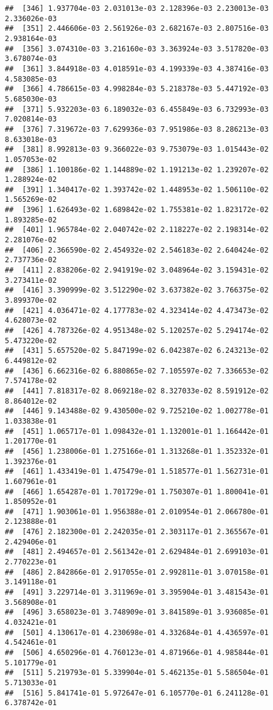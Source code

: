 \documentclass[
]{article}
\begin{document}
\begin{verbatim}
##  [346] 1.937704e-03 2.031013e-03 2.128396e-03 2.230013e-03 2.336026e-03
##  [351] 2.446606e-03 2.561926e-03 2.682167e-03 2.807516e-03 2.938164e-03
##  [356] 3.074310e-03 3.216160e-03 3.363924e-03 3.517820e-03 3.678074e-03
##  [361] 3.844918e-03 4.018591e-03 4.199339e-03 4.387416e-03 4.583085e-03
##  [366] 4.786615e-03 4.998284e-03 5.218378e-03 5.447192e-03 5.685030e-03
##  [371] 5.932203e-03 6.189032e-03 6.455849e-03 6.732993e-03 7.020814e-03
##  [376] 7.319672e-03 7.629936e-03 7.951986e-03 8.286213e-03 8.633018e-03
##  [381] 8.992813e-03 9.366022e-03 9.753079e-03 1.015443e-02 1.057053e-02
##  [386] 1.100186e-02 1.144889e-02 1.191213e-02 1.239207e-02 1.288924e-02
##  [391] 1.340417e-02 1.393742e-02 1.448953e-02 1.506110e-02 1.565269e-02
##  [396] 1.626493e-02 1.689842e-02 1.755381e-02 1.823172e-02 1.893285e-02
##  [401] 1.965784e-02 2.040742e-02 2.118227e-02 2.198314e-02 2.281076e-02
##  [406] 2.366590e-02 2.454932e-02 2.546183e-02 2.640424e-02 2.737736e-02
##  [411] 2.838206e-02 2.941919e-02 3.048964e-02 3.159431e-02 3.273411e-02
##  [416] 3.390999e-02 3.512290e-02 3.637382e-02 3.766375e-02 3.899370e-02
##  [421] 4.036471e-02 4.177783e-02 4.323414e-02 4.473473e-02 4.628073e-02
##  [426] 4.787326e-02 4.951348e-02 5.120257e-02 5.294174e-02 5.473220e-02
##  [431] 5.657520e-02 5.847199e-02 6.042387e-02 6.243213e-02 6.449812e-02
##  [436] 6.662316e-02 6.880865e-02 7.105597e-02 7.336653e-02 7.574178e-02
##  [441] 7.818317e-02 8.069218e-02 8.327033e-02 8.591912e-02 8.864012e-02
##  [446] 9.143488e-02 9.430500e-02 9.725210e-02 1.002778e-01 1.033838e-01
##  [451] 1.065717e-01 1.098432e-01 1.132001e-01 1.166442e-01 1.201770e-01
##  [456] 1.238006e-01 1.275166e-01 1.313268e-01 1.352332e-01 1.392376e-01
##  [461] 1.433419e-01 1.475479e-01 1.518577e-01 1.562731e-01 1.607961e-01
##  [466] 1.654287e-01 1.701729e-01 1.750307e-01 1.800041e-01 1.850952e-01
##  [471] 1.903061e-01 1.956388e-01 2.010954e-01 2.066780e-01 2.123888e-01
##  [476] 2.182300e-01 2.242035e-01 2.303117e-01 2.365567e-01 2.429406e-01
##  [481] 2.494657e-01 2.561342e-01 2.629484e-01 2.699103e-01 2.770223e-01
##  [486] 2.842866e-01 2.917055e-01 2.992811e-01 3.070158e-01 3.149118e-01
##  [491] 3.229714e-01 3.311969e-01 3.395904e-01 3.481543e-01 3.568908e-01
##  [496] 3.658023e-01 3.748909e-01 3.841589e-01 3.936085e-01 4.032421e-01
##  [501] 4.130617e-01 4.230698e-01 4.332684e-01 4.436597e-01 4.542461e-01
##  [506] 4.650296e-01 4.760123e-01 4.871966e-01 4.985844e-01 5.101779e-01
##  [511] 5.219793e-01 5.339904e-01 5.462135e-01 5.586504e-01 5.713033e-01
##  [516] 5.841741e-01 5.972647e-01 6.105770e-01 6.241128e-01 6.378742e-01

\end{verbatim}
\end{document}

